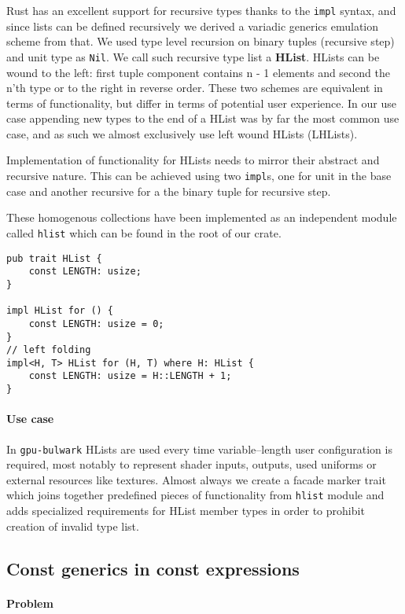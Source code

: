 Rust has an excellent support for recursive types thanks to the \texttt{impl} syntax, and since lists can be defined recursively we derived a variadic generics emulation scheme from that.
We used type level recursion on binary tuples (recursive step) and unit type as \texttt{Nil}. We call such recursive type list a \textbf{HList}.
HLists can be wound to the left: first tuple component contains n - 1 elements and second the n'th type or to the right in reverse order.
These two schemes are equivalent in terms of functionality, but differ in terms of potential user experience.
In our use case appending new types to the end of a HList was by far the most common use case, and as such we almost exclusively use left wound HLists (LHLists).

Implementation of functionality for HLists needs to mirror their abstract and recursive nature. This can be achieved using two \texttt{impl}s, 
one for unit in the base case and another recursive for a the binary tuple for recursive step.

These homogenous collections have been implemented as an independent module called \texttt{hlist} which can be found in the root of our crate.

\begin{lstlisting}
pub trait HList {
    const LENGTH: usize;
}

impl HList for () {
    const LENGTH: usize = 0;
}
// left folding
impl<H, T> HList for (H, T) where H: HList {
    const LENGTH: usize = H::LENGTH + 1;
}
\end{lstlisting}

\paragraph{Use case}

In \texttt{gpu-bulwark} HLists are used every time variable--length user configuration is required, most notably to represent shader inputs, outputs, used uniforms or external resources like textures.
Almost always we create a facade marker trait which joins together predefined pieces of functionality from \texttt{hlist} module
and adds specialized requirements for HList member types in order to prohibit creation of invalid type list.

\subsection{Const generics in const expressions}

\paragraph{Problem}

